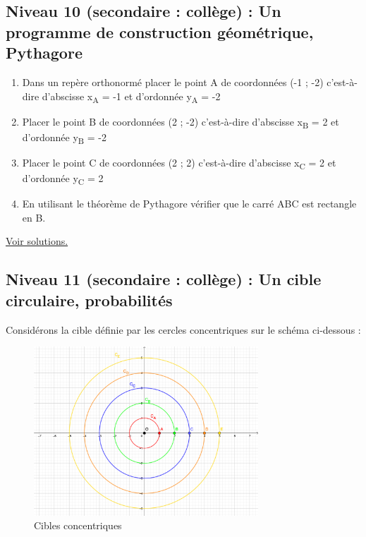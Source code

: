 \documentclass[11pt]{article}
\begin{document}
\newpage


\subsection{Niveau 10 (secondaire : collège) : Un programme de construction géométrique, Pythagore}
\label{sec:org23194a8}

\label{orgbbb0207}


\begin{enumerate}
\item Dans un repère orthonormé placer le point A de coordonnées
(-1 ; -2) c'est-à-dire d'abscisse x\textsubscript{A} = -1 et d'ordonnée
y\textsubscript{A} = -2
\item Placer le point B de coordonnées (2 ; -2) c'est-à-dire
d'abscisse x\textsubscript{B} = 2 et d'ordonnée y\textsubscript{B} = -2
\item Placer le point C de coordonnées (2 ; 2) c'est-à-dire
d'abscisse x\textsubscript{C} = 2 et d'ordonnée y\textsubscript{C} = 2
\item En utilisant le théorème de Pythagore vérifier que le carré ABC est
rectangle en B.
\end{enumerate}



\hyperref[orgd2e6a1a]{Voir solutions.}

\newpage


\subsection{Niveau 11 (secondaire : collège) : Un cible circulaire, probabilités}
\label{sec:org34569d2}

\label{orgbadc756}

Considérons la cible définie par les cercles concentriques sur le
schéma ci-dessous :


\begin{figure}[htbp]
\centering
\includegraphics[width=0.75\textwidth]{./images/cible-proba.png}
\caption{Cibles concentriques}
\end{figure}
\end{document}

